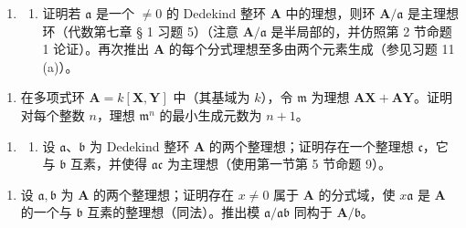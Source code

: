 
\begin{enumerate}
\def\labelenumi{\arabic{enumi}.}
\tightlist
\item
  \begin{enumerate}
  \def\labelenumii{(\alph{enumii})}
  \tightlist
  \item
    证明若 \(\mathfrak{a}\) 是一个 \(\neq 0\) 的 Dedekind 整环 \(\mathbf{A}\) 中的理想，则环 \(\mathbf{A} / \mathfrak{a}\) 是主理想环（代数第七章 § 1 习题 5）（注意 \(\mathbf{A} / \mathfrak{a}\) 是半局部的，并仿照第 2 节命题 1 论证）。再次推出 \(\mathbf{A}\) 的每个分式理想至多由两个元素生成（参见习题 11 (a)）。
  \end{enumerate}
\end{enumerate}

\begin{enumerate}
\def\labelenumi{(\alph{enumi})}
\setcounter{enumi}{1}
\tightlist
\item
  在多项式环 \(\mathbf{A} = k[\mathbf{X},\mathbf{Y}]\) 中（其基域为 \(k\)），令 \(\mathfrak{m}\) 为理想 \(\mathbf{AX} + \mathbf{AY}\)。证明对每个整数 \(n\)，理想 \(\mathfrak{m}^n\) 的最小生成元数为 \(n + 1\)。
\end{enumerate}

\begin{enumerate}
\def\labelenumi{\arabic{enumi}.}
\setcounter{enumi}{1}
\tightlist
\item
  \begin{enumerate}
  \def\labelenumii{(\alph{enumii})}
  \tightlist
  \item
    设 \(\mathfrak{a}\)、\(\mathfrak{b}\) 为 Dedekind 整环 \(\mathbf{A}\) 的两个整理想；证明存在一个整理想 \(\mathfrak{c}\)，它与 \(\mathfrak{b}\) 互素，并使得 \(\mathfrak{ac}\) 为主理想（使用第一节第 5 节命题 9）。
  \end{enumerate}
\end{enumerate}

\begin{enumerate}
\def\labelenumi{(\alph{enumi})}
\setcounter{enumi}{1}
\tightlist
\item
  设 \(\mathfrak{a}, \mathfrak{b}\) 为 \(\mathbf{A}\) 的两个整理想；证明存在 \(x \neq 0\) 属于 \(\mathbf{A}\) 的分式域，使 \(x\mathfrak{a}\) 是 \(\mathbf{A}\) 的一个与 \(\mathfrak{b}\) 互素的整理想（同法）。推出模 \(\mathfrak{a}/\mathfrak{ab}\) 同构于 \(\mathbf{A}/\mathfrak{b}\)。
\end{enumerate}

